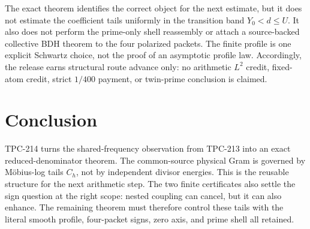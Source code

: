 \documentclass[11pt]{article}
\theoremstyle{definition}
\theoremstyle{remark}
\begin{document}
The exact theorem identifies the correct object for the next estimate, but it
does not estimate the coefficient tails uniformly in the transition band
$Y_0<d\le U$.  It also does not perform the prime-only shell reassembly or
attach a source-backed collective BDH theorem to the four polarized packets.
The finite profile is one explicit Schwartz choice, not the proof of an
asymptotic profile law.  Accordingly, the release earns structural route
advance only: no arithmetic $L^2$ credit, fixed-atom credit, strict
$1/400$ payment, or twin-prime conclusion is claimed.

\section{Conclusion}

TPC-214 turns the shared-frequency observation from TPC-213 into an exact
reduced-denominator theorem.  The common-source physical Gram is governed by
M\"obius-log tails $C_h$, not by independent divisor energies.  This is the
reusable structure for the next arithmetic step.  The two finite certificates
also settle the sign question at the right scope: nested coupling can cancel,
but it can also enhance.  The remaining theorem must therefore control these
tails with the literal smooth profile, four-packet signs, zero axis, and prime
shell all retained.



\end{document}
